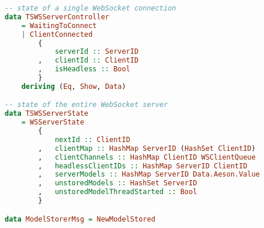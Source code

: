 \begin{lstlisting}[language=Haskell, caption=TEASync Backend server (WSServer.hs), label=lst:java]
-- state of a single WebSocket connection
data TSWSServerController
    = WaitingToConnect
    | ClientConnected 
        { 
            serverId :: ServerID
        ,   clientId :: ClientID
        ,   isHeadless :: Bool
        }
    deriving (Eq, Show, Data)

-- state of the entire WebSocket server
data TSWSServerState
    = WSServerState
        {
            nextId :: ClientID
        ,   clientMap :: HashMap ServerID (HashSet ClientID)
        ,   clientChannels :: HashMap ClientID WSClientQueue
        ,   headlessClientIDs :: HashMap ServerID ClientID
        ,   serverModels :: HashMap ServerID Data.Aeson.Value
        ,   unstoredModels :: HashSet ServerID
        ,   unstoredModelThreadStarted :: Bool
        }

data ModelStorerMsg = NewModelStored

\end{lstlisting}